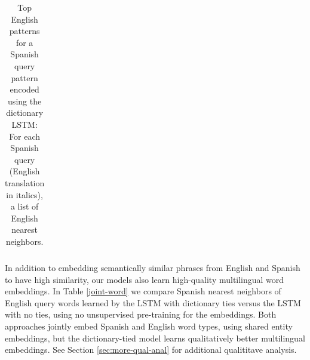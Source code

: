 \begin{table}[h]
\begin{center}
\begin{tabular}{|p{7.6cm}|}
\hline
\end{tabular}
\caption{Top English patterns for a Spanish query pattern encoded using the dictionary LSTM: For each Spanish query (English translation in italics), a list of English nearest neighbors. \label{tab:cross-lingual-relations}}
\end{center}
\end{table}


In addition to embedding semantically similar phrases from English and Spanish to have high similarity, our models also learn high-quality multilingual word embeddings. In Table \ref{joint-word} we compare Spanish nearest neighbors of English query words learned by the LSTM with dictionary ties versus the LSTM with no ties, using no unsupervised pre-training for the embeddings. Both approaches jointly embed Spanish and English word types, using shared entity embeddings, but the dictionary-tied model learns qualitatively better multilingual embeddings. See Section \ref{sec:more-qual-anal} for additional qualititave analysis.


